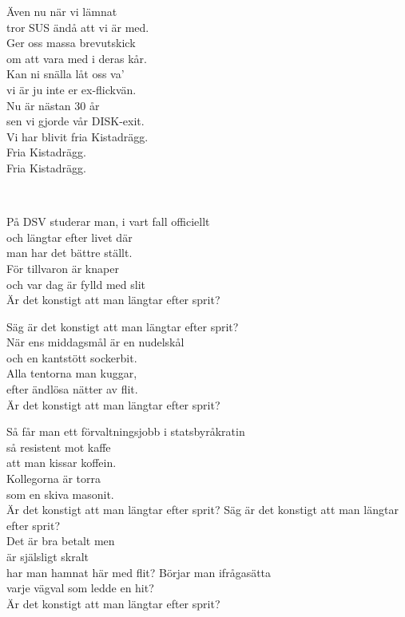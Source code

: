 Även nu när vi lämnat \\ 
tror SUS ändå att vi är med. \\ 
Ger oss massa brevutskick \\ 
om att vara med i deras kår. \\ 
Kan ni snälla låt oss va'  \\ 
vi är ju inte er ex-flickvän. \\ 
Nu är nästan 30 år \\ 
sen vi gjorde vår DISK-exit. \\
\leftrepeat Vi har blivit fria Kistadrägg. \\ 
Fria Kistadrägg. \\ 
Fria Kistadrägg. \rightrepeat


\newpage 


 \\       
\author{Text: Jacke, Quiz och Yoshi}

\songtext{}På DSV studerar man, i vart fall officiellt \\
och längtar efter livet där \\
man har det bättre ställt. \\
För tillvaron är knaper  \\
och var dag är fylld med slit \\
Är det konstigt att man längtar efter sprit?

Säg är det konstigt att man längtar efter sprit? \\
När ens middagsmål är en nudelskål \\
och en kantstött sockerbit. \\
Alla tentorna man kuggar, \\
efter ändlösa nätter av flit. \\
Är det konstigt att man längtar efter sprit?

Så får man ett förvaltningsjobb i statsbyråkratin \\
så resistent mot kaffe \\
att man kissar koffein. \\
Kollegorna är torra \\
som en skiva masonit. \\
Är det konstigt att man längtar efter sprit?
\newpage
Säg är det konstigt att man längtar efter sprit? \\
Det är bra betalt men \\
är själsligt skralt \\
har man hamnat här med flit?
Börjar man ifrågasätta \\
varje vägval som ledde en hit? \\
Är det konstigt att man längtar efter sprit?

